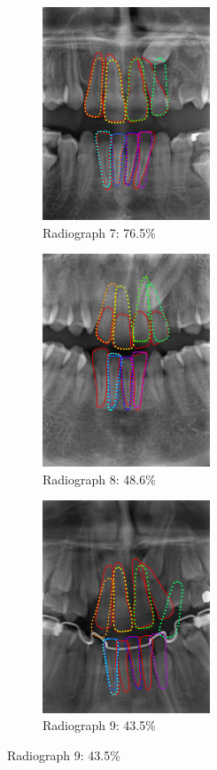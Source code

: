\documentclass[a4paper,10pt]{article}
\begin{document}
\begin{figure}
\begin{subfigure}{.33\textwidth}
\centering
\includegraphics[width=50mm]{tooth_result_overlay_7.png}
\caption{Radiograph 7: 76.5\%}
\end{subfigure}%
\begin{subfigure}{.33\textwidth}
\centering
\includegraphics[width=50mm]{tooth_result_overlay_8.png}
\caption{Radiograph 8: 48.6\%}
\end{subfigure}%
\begin{subfigure}{.33\textwidth}
\centering
\includegraphics[width=50mm]{tooth_result_overlay_9.png}
\caption{Radiograph 9: 43.5\%}
\end{subfigure}%

\end{figure}
\end{document}
